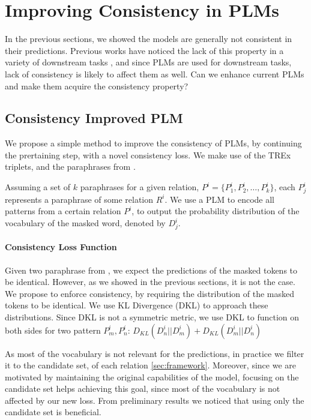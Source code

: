 \section{Improving Consistency in PLMs}
\label{sec:adding_consistency}

In the previous sections, we showed the models are generally not consistent in their predictions. Previous works have noticed the lack of this property in a variety of downstream tasks \cite{}, and since PLMs are used for downstream tasks, lack of consistency is likely to affect them as well.
Can we enhance current PLMs and make them acquire the consistency property?

\subsection{Consistency Improved PLM}
We propose a simple method to improve the consistency of PLMs, by continuing the prertaining step, with a novel consistency loss. 
We make use of the TREx triplets, and the paraphrases from \resource{}.


Assuming a set of $k$ paraphrases for a given relation, $P^i=\{P_1^i, P_2^i, \dots, P_k^i\}$, each $P_j^i$ represents a paraphrase of some relation $R^i$.
We use a PLM to encode all patterns from a certain relation $P^i$, to output the probability distribution of the vocabulary of the masked word, denoted by $D^i_j$.


\paragraph{Consistency Loss Function}
Given two paraphrase from \resource{}, we expect the predictions of the masked tokens to be identical. However, as we showed in the previous sections, it is not the case. 
We propose to enforce consistency, by requiring the distribution of the masked tokens to be identical. We use KL Divergence (DKL) to approach these distributions. Since DKL is not a symmetric metric, we use DKL to function on both sides for two pattern $P^i_m,P^i_n$:
$D_{KL}(D^i_n||D^i_m) + D_{KL} (D^i_m||D^i_n)$

As most of the vocabulary is not relevant for the predictions, in practice we filter it to the candidate set, of each relation \ref{sec:framework}. Moreover, since we are motivated by maintaining the original capabilities of the model, focusing on the candidate set helps achieving this goal, since most of the vocabulary is not affected by our new loss.
From preliminary results we noticed that using only the candidate set is beneficial.

